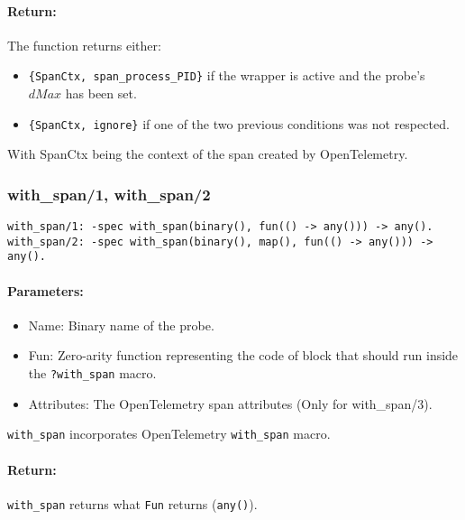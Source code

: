         \paragraph{Return:} 
        The function returns either:
        \begin{itemize}
            \item  \texttt{\{SpanCtx, span\_process\_PID\}} if the wrapper is active and the probe's $dMax$ has been set.
            \item \texttt{\{SpanCtx, ignore\}} if one of the two previous conditions was not respected.
        \end{itemize}
        With SpanCtx being the context of the span created by OpenTelemetry.
        
        \subsubsection{with\_span/1, with\_span/2}
        
        \begin{verbatim}
with_span/1: -spec with_span(binary(), fun(() -> any())) -> any().
with_span/2: -spec with_span(binary(), map(), fun(() -> any())) -> any().
        \end{verbatim}
         
        \paragraph{Parameters:}
            \begin{itemize}
                \item Name: Binary name of the probe.
                \item Fun: Zero-arity function representing the code of block that should run inside the \texttt{?with\_span} macro.
                \item Attributes: The OpenTelemetry span attributes (Only for with\_span/3).

            \end{itemize}

        \texttt{with\_span} incorporates OpenTelemetry \texttt{with\_span} macro. \\
        \paragraph{Return:}
            \texttt{with\_span} returns what \texttt{Fun} returns (\texttt{any()}).
        

